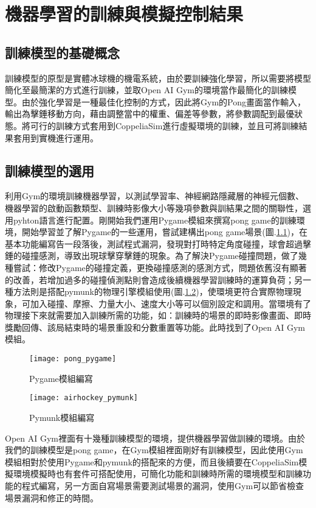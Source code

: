 
\chapter{機器學習的訓練與模擬控制結果}
\section{訓練模型的基礎概念}
 訓練模型的原型是實體冰球機的機電系統，由於要訓練強化學習，所以需要將模型簡化至最簡潔的方式進行訓練，並取Open AI Gym的環境當作最簡化的訓練模型。由於強化學習是一種最佳化控制的方式，因此將Gym的Pong畫面當作輸入，輸出為擊錘移動方向，藉由調整當中的權重、偏差等參數，將參數調配到最優狀態。將可行的訓練方式套用到CoppeliaSim進行虛擬環境的訓練，並且可將訓練結果套用到實機進行運用。\\
\section{訓練模型的選用}
 利用Gym的環境訓練機器學習，以測試學習率、神經網路隱藏層的神經元個數、機器學習的啟動函數類型、訓練時影像大小等幾項參數與訓結果之間的關聯性，選用pyhton語言進行配置。剛開始我們運用Pygame模組來撰寫pong game的訓練環境，開始學習並了解Pygame的一些運用，嘗試建構出pong game場景(圖.\ref{fig.pong_pygame})，在基本功能編寫告一段落後，測試程式漏洞，發現對打時特定角度碰撞，球會超過擊錘的碰撞感測，導致出現球擊穿擊錘的現象。為了解決Pygame碰撞問題，做了幾種嘗試：修改Pygame的碰撞定義，更換碰撞感測的感測方式，問題依舊沒有顯著的改善，若增加過多的碰撞偵測點則會造成後續機器學習訓練時的運算負荷；另一種方法則是搭配pymunk的物理引擎模組使用(圖.\ref{fig.airhockey_pymunk})，使環境更符合實際物理現象，可加入碰撞、摩擦、力量大小、速度大小等可以個別設定和調用。當環境有了物理接下來就需要加入訓練所需的功能，如：訓練時的場景的即時影像畫面、即時獎勵回傳、該局結束時的場景重設和分數重置等功能。此時找到了Open AI Gym模組。\\
\begin{figure}[hbt!]
\begin{center}
\texttt{[image: pong\_pygame]}
\caption{\Large Pygame模組編寫}
\label{fig.pong_pygame}
\end{center}
\end{figure}

\begin{figure}[hbt!]
\begin{center}
\texttt{[image: airhockey\_pymunk]}
\caption{\Large Pymunk模組編寫}
\label{fig.airhockey_pymunk}
\end{center}
\end{figure}
 \newpage %
 Open AI Gym裡面有十幾種訓練模型的環境，提供機器學習做訓練的環境。由於我們的訓練模型是pong game，在Gym模組裡面剛好有訓練模型，因此使用Gym模組相對於使用Pygame和pymunk的搭配來的方便，而且後續要在CoppeliaSim模擬環境模擬時也有套件可搭配使用，可簡化功能和訓練時所需的環境模型和訓練功能的程式編寫，另一方面自寫場景需要測試場景的漏洞，使用Gym可以節省檢查場景漏洞和修正的時間。\\
